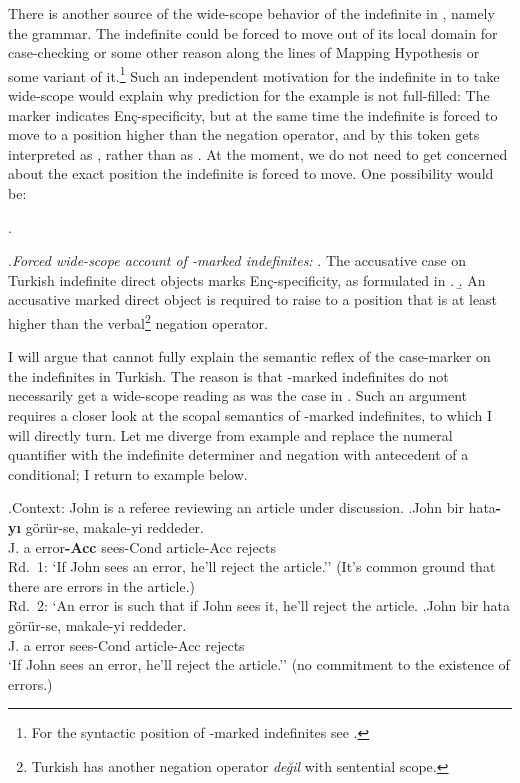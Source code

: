\documentclass[11pt,a4paper]{article}
\newcommand{\encspec}{Enç-specific}
\begin{document}
There is another source of the wide-scope behavior of the indefinite in , namely the grammar. The indefinite could be forced to move out of its local domain for case-checking or some other reason along the lines of  Mapping Hypothesis or some variant of it.\footnote{For the syntactic position of \acc-marked indefinites see .} Such an independent motivation for the indefinite in  to take wide-scope would explain why  prediction for the example is not full-filled: The marker indicates \encspec ity, but at the same time the indefinite is forced to move to a position higher than the negation operator, and by this token  gets interpreted as , rather than as . At the moment, we do not need to get concerned about the exact position the indefinite is forced to move. One possibility would be:

\ex.

\ex.\label{wscopeaccount}{\it Forced wide-scope account of \acc-marked indefinites:}
\a. The accusative case on Turkish indefinite direct objects marks \encspec ity, as formulated in . 
\b. An accusative marked direct object is required to raise to a position that is at least higher than the verbal\footnote{Turkish has another negation operator \textit{değil} with sentential scope.} negation operator.


I will argue that  cannot fully explain the semantic reflex of the case-marker on the indefinites in Turkish. The reason is that \acc-marked indefinites do not necessarily get a wide-scope reading as was the case in . Such an argument requires a closer look at the scopal semantics of \acc-marked indefinites, to which I will directly turn. Let me diverge from  example and  replace the numeral quantifier  with the indefinite determiner  and negation with antecedent of a conditional; I return to  example below.

\ex.Context: John is a referee reviewing an article under discussion.
\ag.\label{conda}John bir hata{\bf-yı} görür-se, makale-yi reddeder.\\
	J. a error{\bf-Acc} sees-Cond article-Acc rejects\\
	Rd.\ 1: `If John sees an error, he'll reject the article.'' (It's common
	ground that there are errors in the article.)\\
	Rd.\ 2: `An error is such that if John sees it, he'll reject the article.
\bg.\label{condz}John bir hata görür-se, makale-yi reddeder.\\
	J. a error sees-Cond article-Acc rejects\\
	`If John sees an error, he'll reject the article.'' (no commitment to the existence of errors.)
\end{document}
